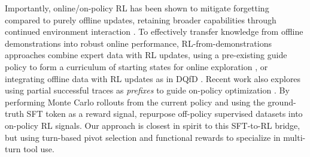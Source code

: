 Importantly, online/on-policy RL has been shown to mitigate forgetting compared to purely offline updates, retaining broader capabilities through continued environment interaction \citep{shenfeld2025rlsrazoronlinereinforcement,chen2025retainingdoingroleonpolicy}. 
To effectively transfer knowledge from offline demonstrations into robust online performance, RL-from-demonstrations approaches combine expert data with RL updates, using a pre-existing guide policy to form a curriculum of starting states for online exploration \citep{uchendu2022jumpstartreinforcementlearning}, or integrating offline data with RL updates as in DQfD \citep{hester2018dqfd}. Recent work also explores using partial successful traces as \emph{prefixes} to guide on-policy optimization \citep{setlur2026prefixrl}.
By performing Monte Carlo rollouts from the current policy and using the ground-truth SFT token as a reward signal, \citet{ming2025onetokenrollout} repurpose off-policy supervised datasets into on-policy RL signals.
Our approach is closest in spirit to this SFT-to-RL bridge, but using turn-based pivot selection and functional rewards to specialize in multi-turn tool use.
